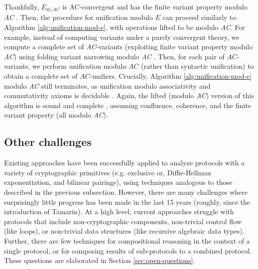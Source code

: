\documentclass{article}
\theoremstyle{definition}
\begin{document}
Thankfully, $E_{\oplus \setminus AC}$ is AC-convergent and has the finite variant property modulo \emph{AC} \cite{tamarin_xor}. 
Then, the procedure for unification modulo $E$ can proceed similarly to Algorithm \ref{alg:unification-mod-e}, 
with operations lifted to be modulo \emph{AC}.
For example, instead of computing variants under a purely convergent
theory, we compute a complete set of \emph{AC}-variants (exploiting finite variant property modulo \emph{AC}) 
using folding variant narrowing modulo \emph{AC} \cite{folding_variant_narrowing}.
Then, for each pair of $AC$-variants,
we perform unification modulo $AC$ (rather than syntactic
unification) to obtain a complete set of $AC$-unifiers.
Crucially, Algorithm \ref{alg:unification-mod-e} modulo \emph{AC} still terminates, 
as unification modulo associativity and commutativity axioms is decidable \cite{unification_modulo_ac}.
Again, the lifted (modulo \emph{AC}) version of this algorithm is sound and complete \cite{tamarin,folding_variant_narrowing}, 
assuming confluence, coherence, and the finite variant property (all modulo \emph{AC}).



\subsection{Other challenges}
Existing approaches have been successfully applied to analyze protocols with a variety of cryptographic primitives 
(e.g. exclusive or, Diffie-Hellman exponentiation, and bilinear pairings), 
using techniques analogous to those described in the previous subsection.
However, there are many challenges where surprisingly little progress has been made in the last 15 years 
(roughly, since the introduction of Tamarin). 
At a high level, current approaches struggle with protocols that include non-cryptographic components, 
non-trivial control flow (like loops), or non-trivial data structures (like recursive algebraic data types). 
Further, there are few techniques for compositional reasoning in the context of a single protocol, 
or for composing results of sub-protocols to a combined protocol. 
These questions are elaborated in Section \ref{sec:open-questions}.
\end{document}
